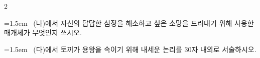 \documentclass[10pt, a4paper]{article}
\begin{document}
\begin{multicols}{2}
\noindent\begin{minipage}{\columnwidth}
\vspace{2mm}
{\hangindent=1.5em  ~(나)에서 자신의 답답한 심정을 해소하고 싶은 소망을 드러내기 위해 사용한 매개체가 무엇인지 쓰시오.\par}

\vspace{3mm}
\noindent\hrulefill
\vspace{2.5mm}
\noindent\hrulefill
\vspace{2.5mm}
\noindent\hrulefill
\vspace{2.5mm}
\noindent\hrulefill
\vspace{2.5mm}
\noindent\hrulefill
\vspace{2.5mm}
\vspace{1mm}
\vspace{4mm}
\end{minipage}
\par

\noindent\begin{minipage}{\columnwidth}
\vspace{2mm}
{\hangindent=1.5em  ~(다)에서 토끼가 용왕을 속이기 위해 내세운 논리를 30자 내외로 서술하시오.\par}

\vspace{3mm}
\noindent\hrulefill
\vspace{2.5mm}
\noindent\hrulefill
\vspace{2.5mm}
\noindent\hrulefill
\vspace{2.5mm}
\noindent\hrulefill
\vspace{2.5mm}
\noindent\hrulefill
\vspace{2.5mm}
\vspace{1mm}
\vspace{4mm}
\end{minipage}
\par


\vspace{1mm}
\vspace{0.5mm}


\end{multicols}
\end{document}
